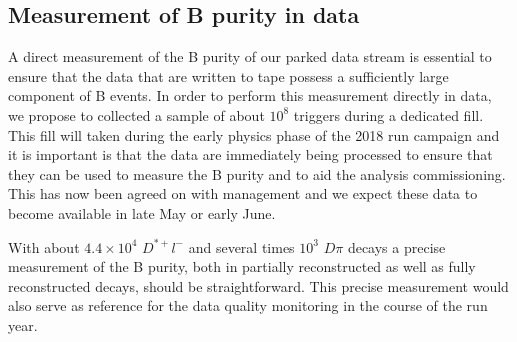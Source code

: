 \documentclass[a4paper,11pt]{article}
\begin{document}
\subsection{Measurement of B purity in data}\label{sub:bpurity}\label{bpurity} 
A direct measurement of the B purity of our parked data stream is essential to ensure that the data that are written to tape possess a sufficiently large component of B events. In order to perform this measurement directly in data, we propose to collected a sample of about $10^8 $ triggers during a dedicated fill. This fill will taken during the early physics phase of the 2018 run campaign and it is important is that the data are immediately being processed to ensure that they can be used to measure the B purity and to aid the analysis commissioning. This has now been agreed on with management and we expect these data to become available in late May or early June.   

With about  $4.4\times10^4$ $D^{*+} l^-$ and several times $10^3$ $D \pi$ decays a precise measurement of the B purity, both in partially reconstructed as well as fully reconstructed decays, should be straightforward. This precise measurement would also serve as reference for the data quality monitoring in the course of the run year. 
\end{document}

